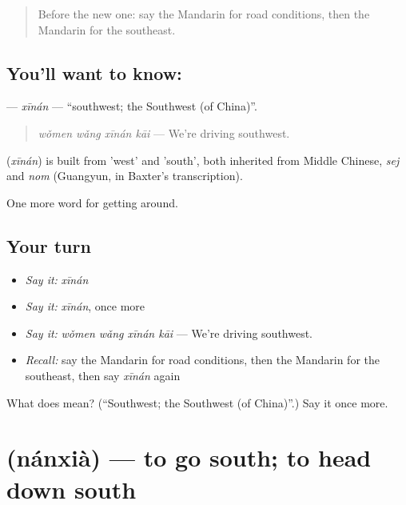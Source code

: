 \label{lesson:ZH-C423-xinan}



\begin{quote}
Before the new one: say the Mandarin for road conditions, then the Mandarin for the southeast.
\end{quote}

\subsection*{You'll want to know: }
\textbf{} — \emph{xīnán} — \textquotedblleft{}southwest; the Southwest (of China)\textquotedblright{}.

\begin{quote}
\emph{wǒmen wǎng xīnán kāi} — We're driving southwest.
\end{quote}

\begin{cousinweb}
\textbf{} (\emph{xīnán}) is built from  'west' and  'south', both inherited from Middle Chinese, \emph{sej} and \emph{nom} (Guangyun, in Baxter's transcription).
\end{cousinweb}

\begin{grammarlens}[title={What you've built}]
One more word for getting around.
\end{grammarlens}

\subsection*{Your turn}
\begin{itemize}
\raggedright
  \item \emph{Say it:} \emph{xīnán}
  \item \emph{Say it:} \emph{xīnán}, once more
  \item \emph{Say it:} \emph{wǒmen wǎng xīnán kāi} — We're driving southwest.
  \item \emph{Recall:} say the Mandarin for road conditions, then the Mandarin for the southeast, then say \emph{xīnán} again
\end{itemize}

\begin{tcolorbox}[breakable,colback=teal!4,colframe=teal!35!black,title={Before you move on}]
What does  mean? (\textquotedblleft{}Southwest; the Southwest (of China)\textquotedblright{}.) Say it once more.
\end{tcolorbox}
\section[\texorpdfstring{\zh{南下} (nánxià)}{南下 (nánxià)}]{ (nánxià) — to go south; to head down south}

